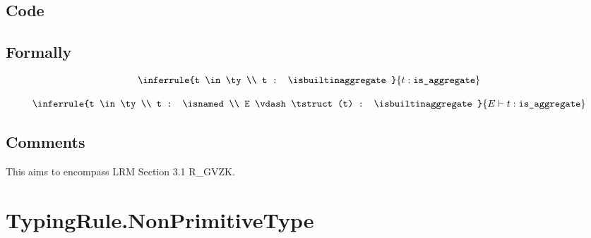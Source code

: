 \documentclass{book}
\begin{document}
    \subsection{Code}

\begin{formal}
      \subsection{Formally}
      
\newcommand\isaggregate[0]{\texttt{is\_aggregate}}
\[
\begin{array}{c}
\inferrule{t \in \ty \\ t : \isbuiltinaggregate}{t : \isaggregate}\\
\\
\inferrule{t \in \ty \\ t : \isnamed \\ E \vdash \tstruct(t) : \isbuiltinaggregate}{E \vdash t : \isaggregate}
\end{array}
\]
\end{formal}

    \subsection{Comments}
    This aims to encompass LRM Section 3.1 R\_GVZK.

\section{TypingRule.NonPrimitiveType}
\end{document}
